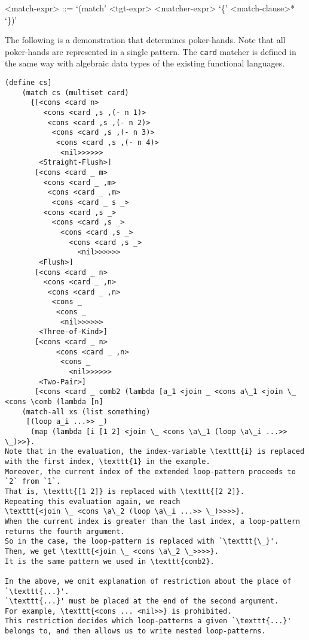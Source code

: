 \documentclass{article}
\begin{document}
\begin{grammar}
<match-expr> ::= `(match' <tgt-expr> <matcher-expr> `\{' <match-clause>* `\})' 
\end{grammar}

The following is a demonstration that determines poker-hands.
Note that all poker-hands are represented in a single pattern.
The \texttt{card} matcher is defined in the same way with algebraic data types of the existing functional languages.

\begin{multicols}{2}
{\scriptsize
\begin{verbatim}
(define cs]
    (match cs (multiset card)
      {[<cons <card n>
         <cons <card ,s ,(- n 1)>
          <cons <card ,s ,(- n 2)>
           <cons <card ,s ,(- n 3)>
            <cons <card ,s ,(- n 4)>
             <nil>>>>>>
        <Straight-Flush>]
       [<cons <card _ m>
         <cons <card _ ,m>
          <cons <card _ ,m>
           <cons <card _ s _>
         <cons <card ,s _>
           <cons <card ,s _>
             <cons <card ,s _>
               <cons <card ,s _>
                 <nil>>>>>>
        <Flush>]
       [<cons <card _ n>
         <cons <card _ ,n>
          <cons <card _ ,n>
           <cons _
            <cons _
             <nil>>>>>>
        <Three-of-Kind>]
       [<cons <card _ n>
            <cons <card _ ,n>
             <cons _
               <nil>>>>>>
        <Two-Pair>]
       [<cons <card _ comb2 (lambda [a_1 <join _ <cons a\_1 <join \_ <cons \comb (lambda [n]
    (match-all xs (list something)
     [(loop a_i ...>> _)
      (map (lambda [i [1 2] <join \_ <cons \a\_1 (loop \a\_i ...>> \_)>>}.
Note that in the evaluation, the index-variable \texttt{i} is replaced with the first index, \texttt{1} in the example.
Moreover, the current index of the extended loop-pattern proceeds to `2` from `1`.
That is, \texttt{[1 2]} is replaced with \texttt{[2 2]}.
Repeating this evaluation again, we reach
\texttt{<join \_ <cons \a\_2 (loop \a\_i ...>> \_)>>>>}.
When the current index is greater than the last index, a loop-pattern returns the fourth argument.
So in the case, the loop-pattern is replaced with `\texttt{\_}'.
Then, we get \texttt{<join \_ <cons \a\_2 \_>>>>}.
It is the same pattern we used in \texttt{comb2}.

In the above, we omit explanation of restriction about the place of `\texttt{...}'.
`\texttt{...}' must be placed at the end of the second argument.
For example, \texttt{<cons ... <nil>>} is prohibited.
This restriction decides which loop-patterns a given `\texttt{...}' belongs to, and then allows us to write nested loop-patterns.


\end{verbatim}}
\end{multicols}
\end{document}
